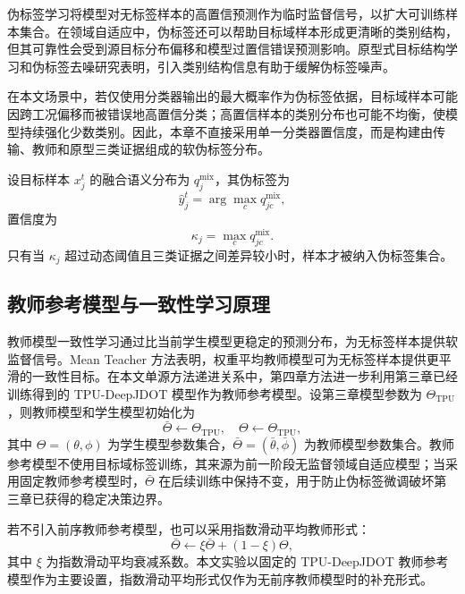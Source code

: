\documentclass{seuthesis-2022}
\begin{document}
伪标签学习将模型对无标签样本的高置信预测作为临时监督信号，以扩大可训练样本集合\cite{lee2013pseudolabel}。在领域自适应中，伪标签还可以帮助目标域样本形成更清晰的类别结构，但其可靠性会受到源目标分布偏移和模型过置信错误预测影响。原型式目标结构学习和伪标签去噪研究表明，引入类别结构信息有助于缓解伪标签噪声\cite{zhang2021proda}。

在本文场景中，若仅使用分类器输出的最大概率作为伪标签依据，目标域样本可能因跨工况偏移而被错误地高置信分类；高置信样本的类别分布也可能不均衡，使模型持续强化少数类别。因此，本章不直接采用单一分类器置信度，而是构建由传输、教师和原型三类证据组成的软伪标签分布。

设目标样本 $x_j^t$ 的融合语义分布为 $q_j^{\mathrm{mix}}$，其伪标签为
\begin{equation}
    \hat{y}_j^t = \arg\max_c q_{jc}^{\mathrm{mix}},
\end{equation}
置信度为
\begin{equation}
    \kappa_j = \max_c q_{jc}^{\mathrm{mix}}.
\end{equation}
只有当 $\kappa_j$ 超过动态阈值且三类证据之间差异较小时，样本才被纳入伪标签集合。

\subsection{教师参考模型与一致性学习原理}

教师模型一致性学习通过比当前学生模型更稳定的预测分布，为无标签样本提供软监督信号。Mean Teacher 方法表明，权重平均教师模型可为无标签样本提供更平滑的一致性目标\cite{tarvainen2017meanteacher}。在本文单源方法递进关系中，第四章方法进一步利用第三章已经训练得到的 TPU-DeepJDOT 模型作为教师参考模型。设第三章模型参数为 $\Theta_{\mathrm{TPU}}$，则教师模型和学生模型初始化为
\begin{equation}
    \bar{\Theta}\leftarrow \Theta_{\mathrm{TPU}},
    \quad
    \Theta\leftarrow \Theta_{\mathrm{TPU}},
\end{equation}
其中 $\Theta=(\theta,\phi)$ 为学生模型参数集合，$\bar{\Theta}=(\bar{\theta},\bar{\phi})$ 为教师模型参数集合。教师参考模型不使用目标域标签训练，其来源为前一阶段无监督领域自适应模型；当采用固定教师参考模型时，$\bar{\Theta}$ 在后续训练中保持不变，用于防止伪标签微调破坏第三章已获得的稳定决策边界。

若不引入前序教师参考模型，也可以采用指数滑动平均教师形式：
\begin{equation}
    \bar{\Theta}
    \leftarrow
    \xi\bar{\Theta}
    +
    (1-\xi)\Theta,
\end{equation}
其中 $\xi$ 为指数滑动平均衰减系数。本文实验以固定的 TPU-DeepJDOT 教师参考模型作为主要设置，指数滑动平均形式仅作为无前序教师模型时的补充形式。
\end{document}
